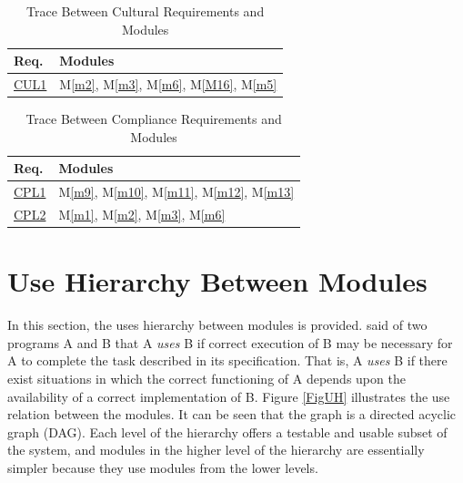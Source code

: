 \documentclass[12pt, titlepage]{article}
\newcommand{\mref}[1]{M\ref{#1}}
\begin{document}
\begin{table}[H]
\centering
\begin{tabular}{p{} p{}}
\toprule
\textbf{Req.} & \textbf{Modules}\\
\midrule
\hyperref[req:CR1]{CUL1} & \mref{m2}, \mref{m3}, \mref{m6}, \mref{M16}, \mref{m5}\\
\bottomrule
\end{tabular}
\caption{Trace Between Cultural Requirements and Modules}
\label{TblRTCultural}
\end{table}

\begin{table}[H]
\centering
\begin{tabular}{p{} p{}}
\toprule
\textbf{Req.} & \textbf{Modules}\\
\midrule
\hyperref[req:CO1]{CPL1} & \mref{m9}, \mref{m10}, \mref{m11}, \mref{m12}, \mref{m13}\\
\hyperref[req:CO2]{CPL2} & \mref{m1}, \mref{m2}, \mref{m3}, \mref{m6}\\
\bottomrule
\end{tabular}
\caption{Trace Between Compliance Requirements and Modules}
\label{TblRTCompliance}
\end{table}








\section{Use Hierarchy Between Modules} \label{SecUse}

In this section, the uses hierarchy between modules is
provided. \citet{Parnas1978} said of two programs A and B that A {\em uses} B if
correct execution of B may be necessary for A to complete the task described in
its specification. That is, A {\em uses} B if there exist situations in which
the correct functioning of A depends upon the availability of a correct
implementation of B.  Figure \ref{FigUH} illustrates the use relation between
the modules. It can be seen that the graph is a directed acyclic graph
(DAG). Each level of the hierarchy offers a testable and usable subset of the
system, and modules in the higher level of the hierarchy are essentially simpler
because they use modules from the lower levels.

\end{document}
